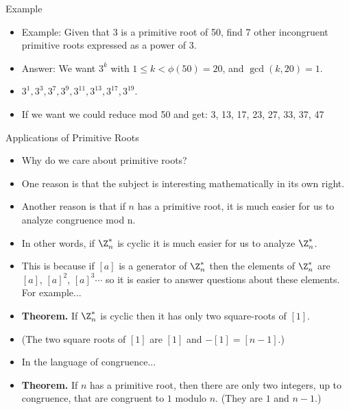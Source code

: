 \documentclass{beamer}
\begin{document}
\begin{frame}{Example}

\begin{itemize}
  \item Example: Given that 3 is a primitive root of 50, find 7 other incongruent primitive roots expressed as a power of 3.
  \item Answer: We want $3^k$ with $1\leq k < \phi(50)=20$, and $\gcd(k,20)=1$.
  \item $3^1,3^3,3^7,3^9,3^{11},3^13,3^{17},3^{19}$.
  \item If we want we could reduce mod 50 and get: 3, 13, 17, 23, 27, 33, 37, 47
\end{itemize}

\end{frame}

\begin{frame}{Applications of Primitive Roots}

\begin{itemize}
  \item Why do we care about primitive roots?
  \item One reason is that the subject is interesting mathematically in its own right.
  \item Another reason is that if $n$ has a primitive root, it is much easier for us to
  analyze congruence mod n.
  \item In other words, if $\Z_n^*$ is cyclic it is much easier for us to analyze $\Z_n^*$.
  \item This is because if $[a]$ is a generator of $\Z_n^*$ then the elements of
  $\Z_n^*$ are $[a]$, $[a]^2$, $[a]^3\cdots$ so it is easier to answer questions about these elements. For example...
  \item \textbf{Theorem.} If $\Z_n^*$ is cyclic then it has only two square-roots of $[1]$.
  \item (The two square roots of $[1]$ are $[1]$ and $-[1] = [n-1]$.)
  \item In the language of congruence...
  \item \textbf{Theorem.} If $n$ has a primitive root, then there are only two integers, up to congruence, that are congruent to $1$ modulo $n$. (They are $1$ and $n-1$.)
\end{itemize}

\end{frame}
\end{document}
